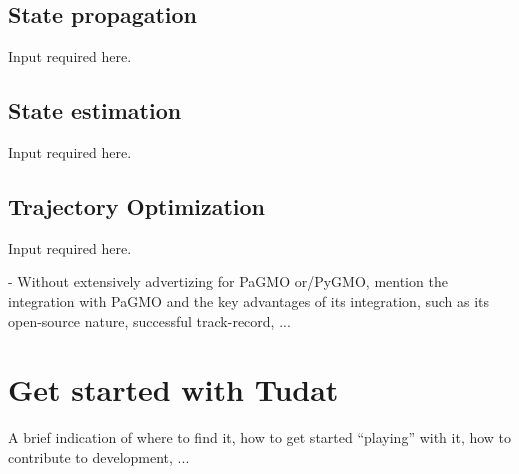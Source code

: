 \documentclass[]{IAC_style_template_original}
\begin{document}
    \subsection{State propagation}
    \lbrack Input required here.\rbrack

    \subsection{State estimation}
    \lbrack Input required here.\rbrack

    \subsection{Trajectory Optimization}
    \lbrack Input required here.\rbrack
    
    - Without extensively advertizing for PaGMO \lbrack or/PyGMO\rbrack, mention the integration with PaGMO and the key advantages of its integration, such as its open-source nature, successful track-record, ...

\section{Get started with Tudat}
    A brief indication of where to find it, how to get started ``playing'' with it, how to contribute to development, ...
\end{document}
